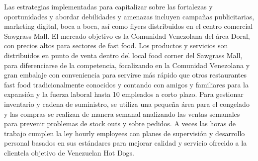 Las estrategias implementadas para capitalizar sobre las fortalezas y oportunidades y abordar debilidades y amenazas incluyen campañas publicitarias, marketing digital, boca a boca, así como flyers distribuidos en el centro comercial Sawgrass Mall. El mercado objetivo es la Comunidad Venezolana del área Doral, con precios altos para sectores de fast food. Los productos y servicios son distribuidos en punto de venta dentro del local food corner del Sawgrass Mall, para diferenciarse de la competencia, focalizando en la Comunidad Venezolana y gran embalaje con conveniencia para servirse más rápido que otros restaurantes fast food tradicionalmente conocidos y contando con amigos y familiares para la expansión y la fuerza laboral hasta 10 empleados a corto plazo. Para gestionar inventario y cadena de suministro, se utiliza una pequeña área para el congelado y las compras se realizan de manera semanal analizando las ventas semanales para prevenir problemas de stock outs y sobre pedidos. A veces las horas de trabajo cumplen la ley hourly employees con planes de supervisión y desarrollo personal basados en sus estándares para mejorar calidad y servicio ofrecido a la clientela objetivo de Venezuelan Hot Dogs.
